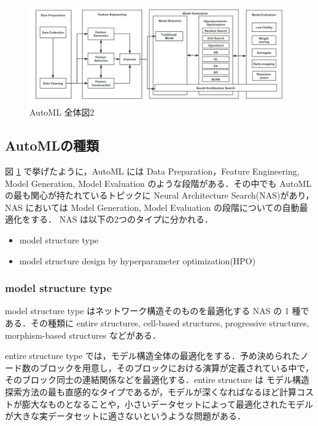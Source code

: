 \documentclass[twocolumn]{ujarticle}   %
\begin{document}
	\begin{figure}[htb]
		\centering
		\includegraphics[width=2.0\columnwidth]{data/autoML-overview.png}
		\caption{AutoML 全体図2}
		\label{fig:automl-overview}
	\end{figure}


	\subsection{AutoMLの種類}
	図 \ref{fig:automl-overview} で挙げたように，AutoML には Data Preparation，Feature Engineering, Model Generation, Model Evaluation のような段階がある．その中でも
	AutoMLの最も関心が持たれているトピックに Neural Architecture Search(NAS)があり，NAS においては Model Generation, Model Evaluation の段階についての自動最適化をする．
	NAS は以下の2つのタイプに分かれる．

	\begin{itemize}
		\item{model structure type}
		\item{model structure design by hyperparameter optimization(HPO)}
	\end{itemize}

	\subsubsection{model structure type}
	model structure type はネットワーク構造そのものを最適化する NAS の 1 種である．その種類に entire structures, cell-based structures, progressive structures, morphism-based structures などがある．

	entire structure type では，モデル構造全体の最適化をする．予め決められたノード数のブロックを用意し，そのブロックにおける演算が定義されている中で，そのブロック同士の連結関係などを最適化する．entire structure は モデル構造探索方法の最も直感的なタイプであるが，モデルが深くなればなるほど計算コストが膨大なものとなることや，小さいデータセットによって最適化されたモデルが大きな実データセットに適さないというような問題がある．
\end{document}

